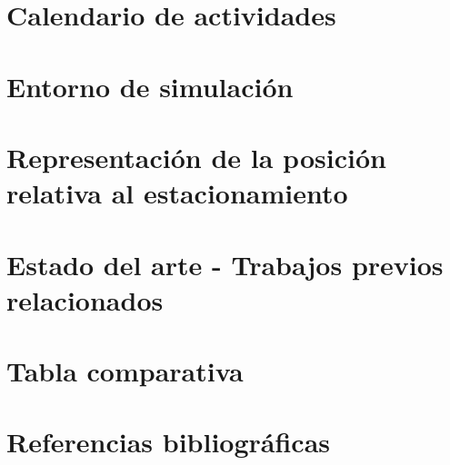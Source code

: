 \documentclass[12pt,letterpaper,final]{article}
\begin{document}
    \section*{Calendario de actividades}
    
    \clearpage

    \section*{Entorno de simulación}
    
    \clearpage

    \section*{Representación de la posición relativa al estacionamiento}
    
    \clearpage



    \section*{Estado del arte - Trabajos previos relacionados}
    

    \section*{Tabla comparativa}
    
    \clearpage

    \section*{Referencias bibliográficas}
    
    
\end{document}
